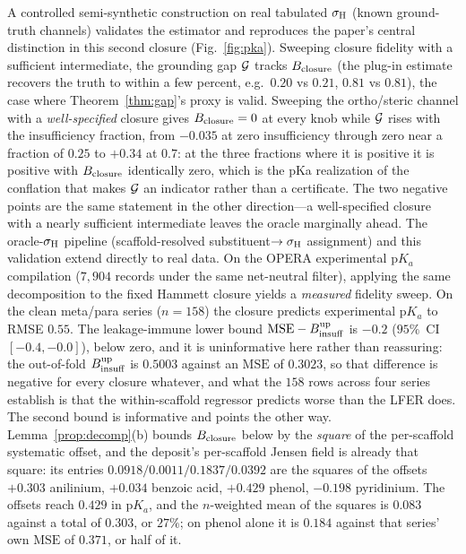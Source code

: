 A controlled semi-synthetic construction on real tabulated $\sigma_{\mathrm H}$ (known ground-truth
channels) validates the estimator and reproduces the paper's central distinction in this second
closure (Fig.~\ref{fig:pka}). Sweeping closure fidelity with a sufficient intermediate, the
grounding gap $\mathcal{G}$ tracks $B_{\mathrm{closure}}$ (the plug-in estimate recovers the truth to within a few
percent, e.g.\ $0.20$ vs $0.21$, $0.81$ vs $0.81$), the case where Theorem~\ref{thm:gap}'s
proxy is valid. Sweeping the ortho/steric channel with a \emph{well-specified} closure gives
$B_{\mathrm{closure}}=0$ at every knob while $\mathcal{G}$ rises with the insufficiency fraction, from $-0.035$ at zero
insufficiency through zero near a fraction of $0.25$ to $+0.34$ at $0.7$: at the three fractions
where it is positive it is positive with $B_{\mathrm{closure}}$ identically zero, which is the pKa realization of
the conflation that makes $\mathcal{G}$ an indicator rather than a certificate. The two negative points
are the same statement in the other direction---a well-specified closure with a nearly sufficient
intermediate leaves the oracle marginally ahead. The oracle-$\sigma_{\mathrm H}$ pipeline
(scaffold-resolved substituent$\to\sigma_{\mathrm H}$ assignment) and this validation extend directly to real
data. On the OPERA experimental $\mathrm pK_a$ compilation \cite{mansouri2019opera} ($7{,}904$
records under the same net-neutral filter), applying the same decomposition to the fixed Hammett
closure yields a \emph{measured} fidelity sweep. On the clean meta/para series ($n{=}158$) the closure
predicts experimental $\mathrm pK_a$ to RMSE $0.55$. The leakage-immune lower bound
$\mathrm{MSE}-B_{\mathrm{insuff}}^{\mathrm{up}}$ is $-0.2$ ($95\%$~CI $[-0.4,-0.0]$), below zero, and it is
uninformative here rather than reassuring: the out-of-fold $B_{\mathrm{insuff}}^{\mathrm{up}}$ is $0.5003$
against an $\mathrm{MSE}$ of $0.3023$, so that difference is negative for every closure whatever,
and what the $158$ rows across four series establish is that the within-scaffold regressor predicts
worse than the LFER does. The second bound is informative and points the other way.
Lemma~\ref{prop:decomp}(b) bounds $B_{\mathrm{closure}}$ below by the \emph{square} of the per-scaffold systematic
offset, and the deposit's per-scaffold Jensen field is already that square: its entries
$0.0918/0.0011/0.1837/0.0392$ are the squares of the offsets $+0.303$ anilinium, $+0.034$
benzoic acid, $+0.429$ phenol, $-0.198$ pyridinium. The offsets reach $0.429$ in $\mathrm pK_a$, and
the $n$-weighted mean of the squares is $0.083$ against a total of $0.303$, or $27\%$; on phenol
alone it is $0.184$ against that series' own $\mathrm{MSE}$ of $0.371$, or half of it.
